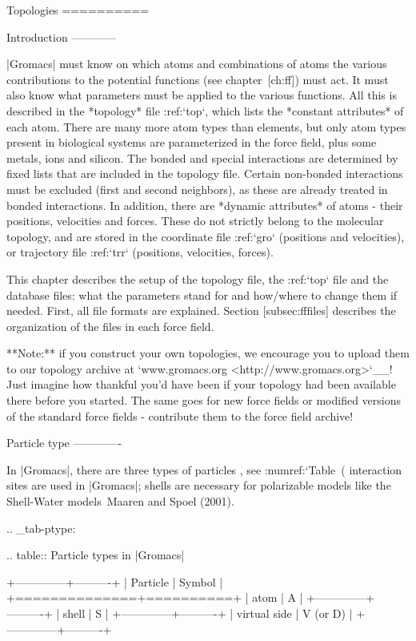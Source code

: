 Topologies
==========

Introduction
------------

|Gromacs| must know on which atoms and combinations of atoms the various
contributions to the potential functions (see chapter [ch:ff]) must act.
It must also know what parameters must be applied to the various
functions. All this is described in the *topology* file :ref:`top`, which
lists the *constant attributes* of each atom. There are many more atom
types than elements, but only atom types present in biological systems
are parameterized in the force field, plus some metals, ions and
silicon. The bonded and special interactions are determined by fixed
lists that are included in the topology file. Certain non-bonded
interactions must be excluded (first and second neighbors), as these are
already treated in bonded interactions. In addition, there are *dynamic
attributes* of atoms - their positions, velocities and forces. These do
not strictly belong to the molecular topology, and are stored in the
coordinate file :ref:`gro` (positions and velocities), or
trajectory file :ref:`trr` (positions, velocities, forces).

This chapter describes the setup of the topology file, the :ref:`top` file and
the database files: what the parameters stand for and how/where to
change them if needed. First, all file formats are explained. Section
[subsec:fffiles] describes the organization of the files in each force
field.

**Note:** if you construct your own topologies, we encourage you to
upload them to our topology archive at
`www.gromacs.org <http://www.gromacs.org>`__! Just imagine how thankful
you’d have been if your topology had been available there before you
started. The same goes for new force fields or modified versions of the
standard force fields - contribute them to the force field archive!

Particle type
-------------

In |Gromacs|, there are three types of
particles
, see :numref:`Table (%
interaction sites are used in |Gromacs|; shells are necessary for
polarizable models like the Shell-Water models Maaren and Spoel (2001).

.. _tab-ptype:

.. table:: Particle types in |Gromacs|

           +--------------+----------+
           | Particle     | Symbol   |
           +==============+==========+
           | atom         | A        |
           +--------------+----------+
           | shell        | S        |
           +--------------+----------+
           | virtual side | V (or D) |
           +--------------+----------+


